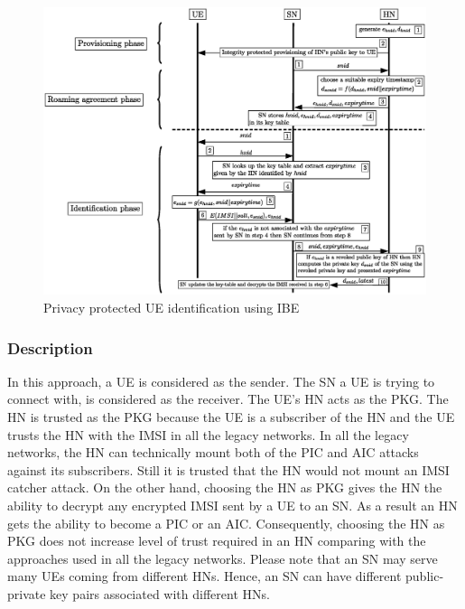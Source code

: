 \documentclass[12pt]{llncs}
\begin{document}
\begin{figure}
\begin{center}
  \includegraphics[width=.98\textwidth]{solution_based_on_ibc.eps}
\caption{Privacy protected UE identification using IBE}
\label{fig:solution_ibc}       %
\end{center}
\end{figure}

\subsubsection{Description}
In this approach, a UE is considered as the sender. The SN a UE is trying to connect with, is considered as the receiver. The UE's HN acts as the PKG. The HN is trusted as the PKG because the UE is a subscriber of the HN and the UE trusts the HN with the IMSI in all the legacy networks. In all the legacy networks, the HN can technically mount both of the PIC and AIC attacks against its subscribers. Still it is trusted that the HN would not mount an IMSI catcher attack. On the other hand, choosing the HN as PKG gives the HN the ability to decrypt any encrypted IMSI sent by a UE to an SN. As a result an HN gets the ability to become a PIC or an AIC. Consequently, choosing the HN as PKG does not increase level of trust required in an HN comparing with the approaches used in all the legacy networks. Please note that an SN may serve many UEs coming from different HNs. Hence, an SN can have different public-private key pairs associated with different HNs. 
\end{document}
